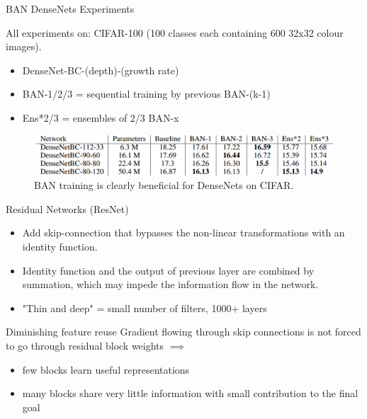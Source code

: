 \documentclass{beamer}
\begin{document}
\begin{frame}{BAN DenseNets Experiments }

All experiments on: CIFAR-100 (100 classes each containing 600 32x32 colour images).

\begin{itemize}
\item DenseNet-BC-(depth)-(growth rate)
\item BAN-1/2/3 = sequential training by previous BAN-(k-1)
\item Ens*2/3 = ensembles of 2/3 BAN-x
\end{itemize}

\begin{figure}[h]
\includegraphics[width=\textwidth]{img/denseNet_experiment}
\caption{BAN training is clearly beneficial for DenseNets on CIFAR. \cite{cit:ban}}
\end{figure}

\end{frame}
\begin{frame}{Residual Networks (ResNet)}
\begin{itemize}
\item Add skip-connection that bypasses the non-linear transformations with an identity function.
\item Identity function and the output of previous layer are combined by summation, which may impede the information flow in the network.
\item "Thin and deep" = small number of filters, 1000+ layers
\end{itemize}

\begin{block}{Diminishing feature reuse}
Gradient flowing through skip connections is not forced to go through residual block weights $\implies$ 

\begin{itemize}
\item few blocks learn useful representations 
\item many blocks share very little information with
small contribution to the final goal
\end{itemize}
\end{block}

\end{frame}
\end{document}
